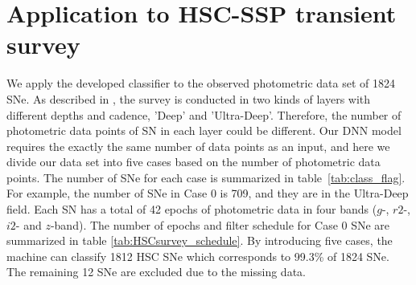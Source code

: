 \documentclass[proof]{pasj01}
\begin{document}
\section{Application to HSC-SSP transient survey}
\label{sec:h}
%
We apply the developed classifier to the observed photometric data set of 1824 SNe.
As described in \citet{yasuda19a}, the survey %
is conducted in two kinds of layers with different depths and cadence, 'Deep' and 'Ultra-Deep'.
Therefore, the number of photometric data points of SN in each layer could be different.
Our DNN model requires the exactly the same number of data points as an input, and here we divide
our data set into five cases based on the number of photometric data points.
The number of SNe for each case is summarized in table\ \ref{tab:class_flag}.
For example, the number of SNe in Case 0 is 709, and they are in the Ultra-Deep field.  Each SN has a total of 
42 epochs of photometric data in four bands ($g$-, $r2$-, $i2$- and $z$-band).
The number of epochs and filter schedule for Case 0 SNe are summarized in table \ref{tab:HSCsurvey_schedule}.
By introducing five cases, the machine can classify 1812 HSC SNe which corresponds to 99.3\% of 1824 SNe.
The remaining 12 SNe are excluded due to the missing data. 
%
\begin{table}[htbp]
\label{tab:class_flag}
\end{table}
%
%
\begin{table}[htbp]
\label{tab:HSCsurvey_schedule}
\end{table}
\end{document}
